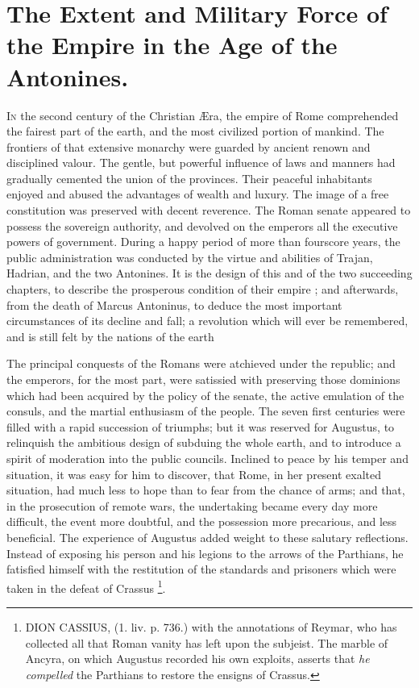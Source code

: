 \chapter{The Extent and Military Force of the Empire in the Age  of the Antonines.}




\lettrine[lines=3]{I}n the second century of the Christian Æra, the empire of Rome comprehended the fairest part of the earth, and the most civilized portion of mankind. The frontiers of that extensive monarchy were guarded by ancient renown and disciplined valour. The gentle, but powerful influence of laws and manners had gradually cemented the union of the provinces. Their peaceful inhabitants enjoyed and abused the advantages of wealth and luxury. The image of a free constitution was preserved with decent reverence. The Roman senate appeared to possess the sovereign authority, and devolved on the emperors all the executive powers of government.  During a happy period of more than fourscore years, the public administration was conducted by the virtue and abilities of Trajan, Hadrian, and the two Antonines. It is the design of this and of the two succeeding chapters, to describe the prosperous condition of their empire ; and afterwards, from the death of Marcus Antoninus, to deduce the most important circumstances of its decline and fall; a revolution which will ever be remembered, and is still felt by the nations of the earth

 The principal conquests of the Romans were atchieved under the republic; and the emperors, for the most part, were satissied with preserving those dominions which had been acquired by the policy of the senate, the active emulation of the consuls, and the martial enthusiasm of the people. The seven first centuries were filled with a rapid succession of triumphs; but it was reserved for Augustus, to relinquish the ambitious design of subduing the whole earth, and to introduce a spirit of moderation into the public councils. Inclined to peace by his temper and situation, it was easy for him to discover, that Rome, in her present exalted situation, had much less to hope than to fear from the chance of arms; and that, in the prosecution of remote wars, the undertaking became every day more difficult, the event more doubtful, and the possession more precarious, and less beneficial. The experience of Augustus added weight to these salutary reflections. Instead of exposing his person and his legions to the arrows of the Parthians, he fatisfied himself with the restitution of the standards and prisoners which were taken in the defeat of Crassus \footnote{\lettrine[lines=3]{D}ION CASSIUS, (1. liv. p. 736.) with the annotations of Reymar, who has collected all that Roman vanity has left upon the subjeist. The marble of Ancyra, on which Augustus recorded his own exploits, asserts that \emph{he compelled} the Parthians to restore the ensigns of Crassus.}.


